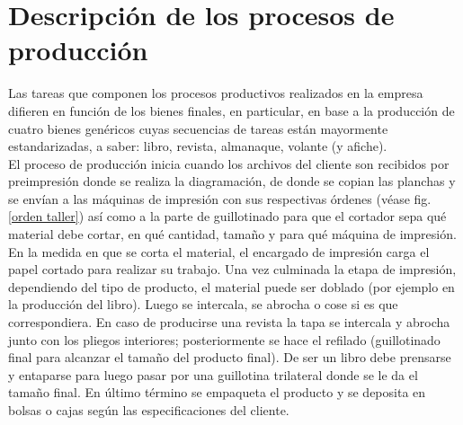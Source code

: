 \documentclass[a4paper, 12pt,twoside]{report}  %
\numberwithin{equation}{subsection} %
\begin{document}
 \section{Descripción de los procesos de producción}
 \label{Descripción de los procesos de producción}
 Las tareas que componen los procesos productivos realizados en la empresa difieren en función de los bienes finales, en particular, en base a la producción de cuatro bienes genéricos cuyas secuencias de tareas están mayormente estandarizadas, a saber: libro, revista, almanaque, volante (y afiche).\\
 \indent El proceso de producción inicia cuando los archivos del cliente son recibidos por preimpresión donde se realiza la diagramación, de donde se copian las planchas y se envían a las máquinas de impresión con sus respectivas órdenes (véase fig. \ref{orden taller}) así como a la parte de guillotinado para que el cortador sepa qué material debe cortar, en qué cantidad, tamaño y para qué máquina de impresión. En la medida en que se corta el material, el encargado de impresión carga el papel cortado para realizar su trabajo. Una vez culminada la etapa de impresión, dependiendo del tipo de producto, el material puede ser doblado (por ejemplo en la producción del libro). Luego se intercala, se abrocha o cose si es que correspondiera. En caso de producirse una revista la tapa se intercala y abrocha junto con los pliegos interiores; posteriormente se hace el refilado (guillotinado final para alcanzar el tamaño del producto final). De ser un libro debe prensarse y entaparse para luego pasar por una guillotina trilateral donde se le da el tamaño final. En último término se empaqueta el producto y se deposita en bolsas o cajas según las especificaciones del cliente.
\end{document}
